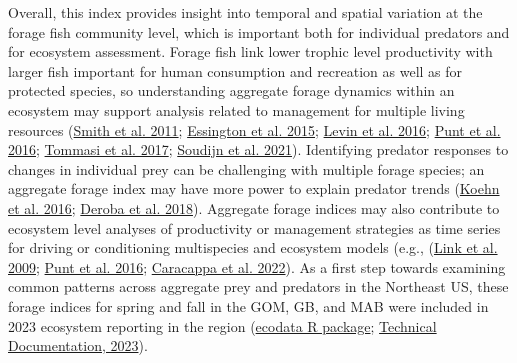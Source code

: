 \documentclass[
]{article}
\begin{document}
Overall, this index provides insight into temporal and spatial variation at the forage fish community level, which is important both for individual predators and for ecosystem assessment. Forage fish link lower trophic level productivity with larger fish important for human consumption and recreation as well as for protected species, so understanding aggregate forage dynamics within an ecosystem may support analysis related to management for multiple living resources (\protect\hyperlink{ref-smith_impacts_2011}{Smith et al. 2011}; \protect\hyperlink{ref-essington_fishing_2015}{Essington et al. 2015}; \protect\hyperlink{ref-levin_thirty-two_2016}{Levin et al. 2016}; \protect\hyperlink{ref-punt_exploring_2016}{Punt et al. 2016}; \protect\hyperlink{ref-tommasi_improved_2017}{Tommasi et al. 2017}; \protect\hyperlink{ref-soudijn_harvesting_2021}{Soudijn et al. 2021}). Identifying predator responses to changes in individual prey can be challenging with multiple forage species; an aggregate forage index may have more power to explain predator trends (\protect\hyperlink{ref-koehn_developing_2016}{Koehn et al. 2016}; \protect\hyperlink{ref-deroba_dream_2018}{Deroba et al. 2018}). Aggregate forage indices may also contribute to ecosystem level analyses of productivity or management strategies as time series for driving or conditioning multispecies and ecosystem models (e.g., (\protect\hyperlink{ref-link_response_2009}{Link et al. 2009}; \protect\hyperlink{ref-punt_exploring_2016}{Punt et al. 2016}; \protect\hyperlink{ref-caracappa_northeast_2022}{Caracappa et al. 2022}). As a first step towards examining common patterns across aggregate prey and predators in the Northeast US, these forage indices for spring and fall in the GOM, GB, and MAB were included in 2023 ecosystem reporting in the region (\href{https://noaa-edab.github.io/ecodata/landing_page}{ecodata R package}; \href{https://noaa-edab.github.io/tech-doc/forage-fish-biomass-indices.html}{Technical Documentation, 2023}).
\end{document}
